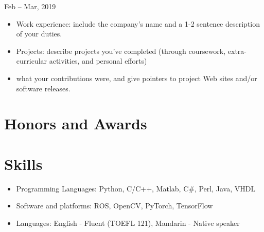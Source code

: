 \documentclass{resume}
\begin{document}
 {} {Feb -- Mar, 2019}
\begin{itemize}
  \item Work experience: include the company's name and a 1-2 sentence description of your duties.
  \item Projects: describe projects you've completed (through coursework, extra-curricular activities, and personal efforts)
  \item what your contributions were, and give pointers to project Web sites and/or software releases.
\end{itemize}


\section{ Honors and Awards}

\section{ Skills}
\begin{itemize}[parsep=0.1ex]
  \item Programming Languages: Python, C/C++, Matlab, C\#, Perl, Java, VHDL
  \item Software and platforms: ROS, OpenCV, PyTorch, TensorFlow
  \item Languages: English - Fluent (TOEFL 121), Mandarin - Native speaker

\end{itemize}



%
%
\end{document}
